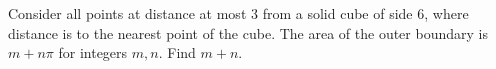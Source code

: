 Consider all points at distance at most 3 from a solid cube of side 6, where distance is to the nearest point of the cube. The area of the outer boundary is $m+n\pi$ for integers $m,n$. Find $m+n$.
